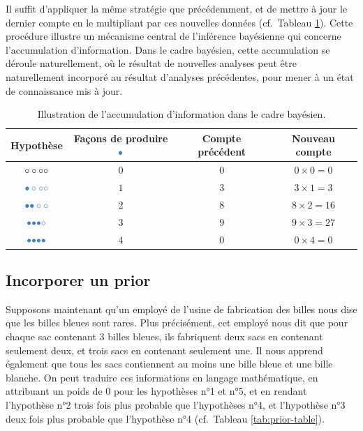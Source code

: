 \documentclass[
  a4paper,11pt,twoside,onecolumn,openright,final,oldfontcommands]{memoir}
\theoremstyle{definition}
\theoremstyle{definition}
\theoremstyle{definition}
\theoremstyle{remark}
\begin{document}
Il suffit d'appliquer la même stratégie que précédemment, et de mettre à jour le dernier compte en le multipliant par ces nouvelles données (cf.~Tableau \ref{tab:accumulation}). Cette procédure illustre un mécanisme central de l'inférence bayésienne qui concerne l'accumulation d'information. Dans le cadre bayésien, cette accumulation se déroule naturellement, où le résultat de nouvelles analyses peut être naturellement incorporé au résultat d'analyses précédentes, pour mener à un état de connaissance mis à jour.

\begin{table}[!htb]

\begin{center}
\begin{threeparttable}

\caption{\label{tab:accumulation}Illustration de l'accumulation d'information dans le cadre bayésien.}

\begin{tabular}{cccc}
\toprule
Hypothèse & Façons de produire $\color{steelblue}{\bullet}$ & Compte précédent & Nouveau compte\\
\midrule
$\LARGE \circ \circ \circ \circ$ & $0$ & $0$ & $0 \times 0 = 0$\\
$\LARGE \color{steelblue}{\bullet} \circ \circ \circ$ & $1$ & $3$ & $3 \times 1 = 3$\\
$\LARGE \color{steelblue}{\bullet} \color{steelblue}{\bullet} \circ \circ$ & $2$ & $8$ & $8 \times 2 = 16$\\
$\LARGE \color{steelblue}{\bullet} \color{steelblue}{\bullet} \color{steelblue}{\bullet} \circ$ & $3$ & $9$ & $9 \times 3 = 27$\\
$\LARGE \color{steelblue}{\bullet} \color{steelblue}{\bullet} \color{steelblue}{\bullet} \color{steelblue}{\bullet}$ & $4$ & $0$ & $0 \times 4 = 0$\\
\bottomrule
\end{tabular}

\end{threeparttable}
\end{center}

\end{table}

\hypertarget{incorporer-un-prior}{%
\subsection{Incorporer un prior}\label{incorporer-un-prior}}

Supposons maintenant qu'un employé de l'usine de fabrication des billes nous dise que les billes bleues sont rares. Plus précisément, cet employé nous dit que pour chaque sac contenant 3 billes bleues, ils fabriquent deux sacs en contenant seulement deux, et trois sacs en contenant seulement une. Il nous apprend également que tous les sacs contiennent au moins une bille bleue et une bille blanche. On peut traduire ces informations en langage mathématique, en attribuant un poids de \(0\) pour les hypothèses n°1 et n°5, et en rendant l'hypothèse n°2 trois fois plus probable que l'hypothèses n°4, et l'hypothèse n°3 deux fois plus probable que l'hypothèse n°4 (cf.~Tableau \ref{tab:prior-table}).
\end{document}
